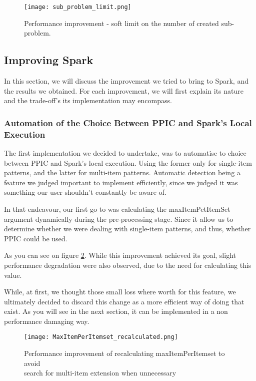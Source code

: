 \documentclass{eplmastersthesis}
\begin{document}
\begin{figure}[h]
  \centering
  \texttt{[image: sub\_problem\_limit.png]}
  \caption{Performance improvement - soft limit on the number of created sub-problem.}
  \label{fig:sub_problem_limit}
\end{figure}

\subsection{Improving Spark}

In this section, we will discuss the improvement we tried to bring to Spark, and the results we obtained. For each improvement, we will first explain its nature and the trade-off's its implementation may encompass.

\subsubsection{Automation of the Choice Between PPIC and Spark's Local Execution}

The first implementation we decided to undertake, was to automatise to choice between PPIC and Spark's local execution. Using the former only for single-item patterns, and the latter for multi-item patterns. Automatic detection being a feature we judged important to implement efficiently, since we judged it was something our user shouldn't constantly be aware of. \newline 

In that endeavour, our first go to was calculating the maxItemPetItemSet argument dynamically during the pre-processing stage. Since it allow us to determine whether we were dealing with single-item patterns, and thus, whether PPIC could be used. \newline

As you can see on figure \ref{fig:maxItemPerItemset_recalculated}.
While this improvement achieved its goal, slight performance degradation were also observed, due to the need for calculating this value. \newline

While, at first, we thought those small loss where worth for this feature, we ultimately decided to discard this change as a more efficient way of doing that exist. As you will see in the next section, it can be implemented in a non performance damaging way.

\begin{figure}[h]
  \centering
  \texttt{[image: MaxItemPerItemset\_recalculated.png]}
  \caption[Automatic detection of item-sets type in dataset]{
		Performance improvement of recalculating maxItemPerItemset to avoid \\
		search for multi-item extension when unnecessary
	\endtabular}
  \label{fig:maxItemPerItemset_recalculated}
\end{figure}
\end{document}
